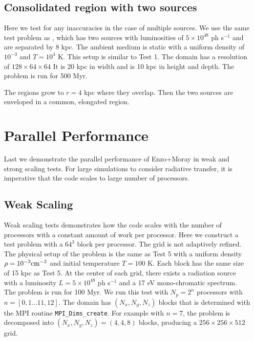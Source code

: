 \documentclass[12pt,preprint]{aastex}
\begin{document}
\subsection{Consolidated  region with two sources}

Here we test for any inaccuracies in the case of multiple sources.  We
use the same test problem as \citet[][\S5.1.2]{Petkova09}, which has
two sources with luminosities of $5 \times 10^{48}$ ph s$^{-1}$ and
are separated by 8 kpc.  The ambient medium is static with a uniform
density of $10^{-3}$ \cubecm and $T = 10^4$ K.  This setup is similar
to Test 1.  The domain has a resolution of $128 \times 64 \times 64$
It is 20 kpc in width and is 10 kpc in height and depth.  The problem
is run for 500 Myr.

The  regions grow to $r = 4$ kpc where they overlap.  Then
the two sources are enveloped in a common, elongated 
region.

\section{Parallel Performance}

Last we demonstrate the parallel performance of Enzo+Moray in weak and
strong scaling tests.  For large simulations to consider radiative
transfer, it is imperative that the code scales to large number of
processors.

\subsection{Weak Scaling}
\label{sec:weak_sc}

Weak scaling tests demonstrates how the code scales with the number of
processors with a constant amount of work per processor.  Here we
construct a test problem with a $64^3$ block per processor.  The grid
is not adaptively refined.  The physical setup of the problem is the
same as Test 5 with a uniform density $\rho = 10^{-3} \cubecm$ and
initial temperature $T = 100$ K.  Each block has the same size of 15
kpc as Test 5.  At the center of each grid, there exists a radiation
source with a luminosity $L = 5 \times 10^{48}$ ph s$^{-1}$ and a 17
eV mono-chromatic spectrum.  The problem is run for 100 Myr.  We run
this test with $N_p = 2^n$ processors with $n = [0,1 \dots 11,12]$.
The domain has $(N_x, N_y, N_z)$ blocks that is determined with the
MPI routine \texttt{MPI\_Dims\_create}.  For example with $n = 7$, the
problem is decomposed into $(N_x, N_y, N_z) = (4,4,8)$ blocks,
producing a $256 \times 256 \times 512$ grid.
\end{document}
